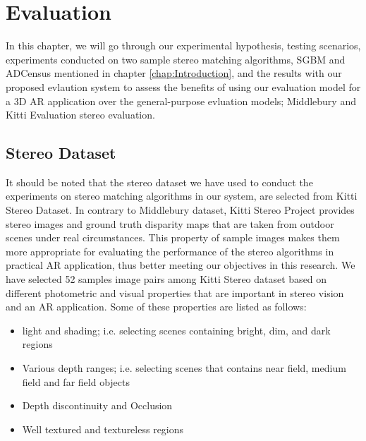 \chapter{Evaluation}
\label{chap:Evaluation}

In this chapter, we will go through our experimental hypothesis, testing scenarios, experiments conducted on two sample 
stereo matching algorithms, SGBM and ADCensus mentioned in chapter \ref{chap:Introduction}, and the results with our
proposed evlaution system to assess the benefits of using our evaluation model for a 3D AR application over the general-purpose evluation models; 
Middlebury and Kitti Evaluation stereo evaluation.

\section{Stereo Dataset}
It should be noted that the stereo dataset we have used to conduct the experiments on stereo matching algorithms in our system,
are selected from Kitti Stereo Dataset.
In contrary to Middlebury dataset, Kitti Stereo Project provides stereo images and ground truth disparity maps
that are taken from outdoor scenes under real circumstances. This property of sample images makes them more appropriate 
for evaluating the performance of the stereo algorithms in practical AR application, thus better meeting our objectives in this research.
We have selected 52 samples image pairs among Kitti Stereo dataset based on different photometric and visual properties that are important
in stereo vision and an AR application. Some 
of these properties are listed as follows:
\begin{itemize}
\item light and shading; i.e. selecting scenes containing bright, dim, and dark regions
\item Various depth ranges; i.e. selecting scenes that contains near field, medium field and far field objects  
\item Depth discontinuity and Occlusion
\item Well textured and textureless regions
\end{itemize}



